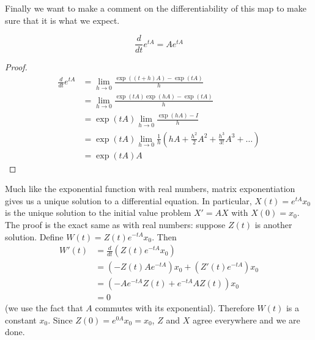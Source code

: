 Finally we want to make a comment on the differentiability of this map to make sure that it is what we expect.
\begin{lemma}
$$ \frac{d}{dt} e^{tA} = A e^{tA} $$
\end{lemma}
\begin{proof}
\begin{align*}
    \frac{d}{dt} e^{tA} &= \lim_{h \to 0} \frac{\exp((t + h)A) - \exp(tA)}{h}\\
    &= \lim_{h \to 0} \frac{\exp(tA)\exp(hA) - \exp(tA)}{h}\\
    &= \exp(tA) \lim_{h \to 0} \frac{\exp(hA) - I}{h}\\
    &= \exp(tA) \lim_{h \to 0} \frac{1}{h} \left( hA + \frac{h^2}{2} A^2 + \frac{h^3}{3!} A^3 + \dots \right)\\
    &= \exp(tA) A
\end{align*}
\end{proof}
Much like the exponential function with real numbers, matrix exponentiation gives us a unique solution to a differential equation. In particular, $X(t) = e^{tA} x_0$ is the unique solution to the initial value problem $X' = AX$ with $X(0) = x_0$. The proof is the exact same as with real numbers: suppose $Z(t)$ is another solution. Define $W(t) = Z(t) e^{-tA} x_0$. Then
\begin{align*}
    W'(t) &= \frac{d}{dt} (Z(t) e^{-tA} x_0)\\
    &= (-Z(t)A e^{-tA}) x_0 + (Z'(t) e^{-tA}) x_0\\
    &= (-A e^{-tA} Z(t) + e^{-tA} AZ(t))x_0\\
    &= 0
\end{align*}
(we use the fact that $A$ commutes with its exponential). Therefore $W(t)$ is a constant $x_0$. Since $Z(0) = e^{0A} x_0 = x_0$, $Z$ and $X$ agree everywhere and we are done.